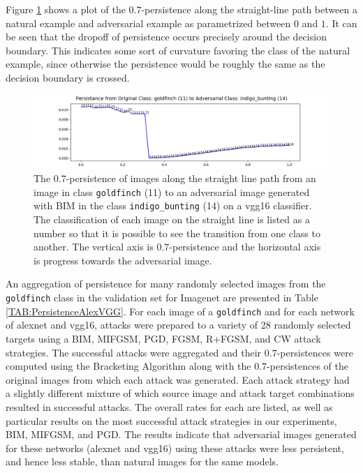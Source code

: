 Figure \ref{fig:persistent_interpimage} shows a plot of the $0.7$-persistence along the straight-line path between a natural example and adversarial example as parametrized between $0$ and $1$. It can be seen that the dropoff of persistence occurs precisely around the decision boundary. This indicates some sort of curvature favoring the class of the natural example, since otherwise the persistence would be roughly the same as the decision boundary is crossed.

\begin{figure}[ht]
\centering
\includegraphics[width = \textwidth]
{c2_figures/persistence_interpolation-IMNET-class-11-vgg16-BIM-48-attack_data-001.png}
\caption{The $0.7$-persistence of images along the straight line path from an image in class \texttt{goldfinch} (11) to an adversarial image generated with BIM in the class \texttt{indigo\_bunting} (14) on a vgg16 classifier. The classification of each image on the straight line is listed as a number so that it is possible to see the transition from one class to another. The vertical axis is $0.7$-persistence and the horizontal axis is progress towards the adversarial image.}\label{fig:persistent_interpimage}
\end{figure}

An aggregation of persistence for many randomly selected images from the \texttt{goldfinch} class in the validation set for Imagenet are presented in Table \ref{TAB:PersistenceAlexVGG}. For each image of a \texttt{goldfinch} and for each network of alexnet and vgg16, attacks were prepared to a variety of 28 randomly selected targets using a BIM, MIFGSM, PGD, FGSM, R+FGSM, and CW attack strategies. The successful attacks were aggregated and their $0.7$-persistences were computed using the Bracketing Algorithm along with the $0.7$-persistences of the original images from which each attack was generated. Each attack strategy had a slightly different mixture of which source image and attack target combinations resulted in successful attacks. The overall rates for each are listed, as well as particular results on the most successful attack strategies in our experiments, BIM, MIFGSM, and PGD. The results indicate that adversarial images generated for these networks (alexnet and vgg16) using these attacks were less persistent, and hence less stable, than natural images for the same models. 


